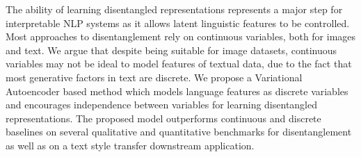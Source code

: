 The ability of learning disentangled representations represents a major step for interpretable NLP systems as it allows latent linguistic features to be controlled. Most approaches to disentanglement rely on continuous variables, both for images and text. We argue that despite being suitable for image datasets, continuous variables may not be ideal to model features of textual data, due to the fact that most generative factors in text are discrete. We propose a Variational Autoencoder based method which models language features as discrete variables and encourages independence between variables for learning disentangled representations. The proposed model outperforms continuous and discrete baselines on several qualitative and quantitative benchmarks for disentanglement as well as on a text style transfer downstream application.
